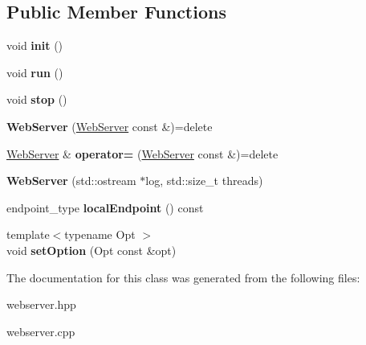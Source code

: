 \subsection*{Public Member Functions}
\begin{DoxyCompactItemize}
\item 
void {\bfseries init} ()\hypertarget{classWebServer_a304f2fd5eb36424ec0811eec75cc703b}{}\label{classWebServer_a304f2fd5eb36424ec0811eec75cc703b}

\item 
void {\bfseries run} ()\hypertarget{classWebServer_a0879d889c9d1071060e868b9149a20c6}{}\label{classWebServer_a0879d889c9d1071060e868b9149a20c6}

\item 
void {\bfseries stop} ()\hypertarget{classWebServer_ab432937d4b1c5d665653319e545292ab}{}\label{classWebServer_ab432937d4b1c5d665653319e545292ab}

\item 
{\bfseries Web\+Server} (\hyperlink{classWebServer}{Web\+Server} const \&)=delete\hypertarget{classWebServer_a0e9f62d14c2839cccd3cf4f208b80388}{}\label{classWebServer_a0e9f62d14c2839cccd3cf4f208b80388}

\item 
\hyperlink{classWebServer}{Web\+Server} \& {\bfseries operator=} (\hyperlink{classWebServer}{Web\+Server} const \&)=delete\hypertarget{classWebServer_a406768ffd4367eb810ff99741629de18}{}\label{classWebServer_a406768ffd4367eb810ff99741629de18}

\item 
{\bfseries Web\+Server} (std\+::ostream $\ast$log, std\+::size\+\_\+t threads)\hypertarget{classWebServer_a4b645e35683e9d370c827e0b7e1566d8}{}\label{classWebServer_a4b645e35683e9d370c827e0b7e1566d8}

\item 
endpoint\+\_\+type {\bfseries local\+Endpoint} () const \hypertarget{classWebServer_aabe00440d1856f3afcd5c3c231156527}{}\label{classWebServer_aabe00440d1856f3afcd5c3c231156527}

\item 
{\footnotesize template$<$typename Opt $>$ }\\void {\bfseries set\+Option} (Opt const \&opt)\hypertarget{classWebServer_aede4fdba9286fc06ce1e0da7d427888c}{}\label{classWebServer_aede4fdba9286fc06ce1e0da7d427888c}

\end{DoxyCompactItemize}


The documentation for this class was generated from the following files\+:\begin{DoxyCompactItemize}
\item 
webserver.\+hpp\item 
webserver.\+cpp\end{DoxyCompactItemize}
